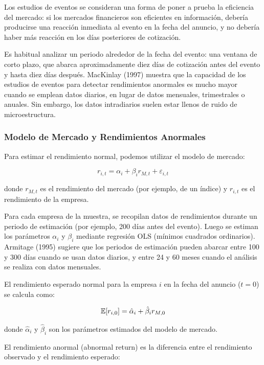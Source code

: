 Los estudios de eventos se consideran una forma de poner a prueba la eficiencia del mercado: si los mercados financieros son eficientes en información, debería producirse una reacción inmediata al evento en la fecha del anuncio, y no debería haber más reacción en los días posteriores de cotización.

Es habitual analizar un periodo alrededor de la fecha del evento: una ventana de corto plazo, que abarca aproximadamente diez días de cotización antes del evento y hasta diez días después. MacKinlay (1997) muestra que la capacidad de los estudios de eventos para detectar rendimientos anormales es mucho mayor cuando se emplean datos diarios, en lugar de datos mensuales, trimestrales o anuales. Sin embargo, los datos intradiarios suelen estar llenos de ruido de microestructura.

\subsubsection{Modelo de Mercado y Rendimientos Anormales}

Para estimar el rendimiento normal, podemos utilizar el modelo de mercado:

\begin{equation}
r_{i,t} = \alpha_i + \beta_i r_{M,t} + \varepsilon_{i,t}
\end{equation}

donde $r_{M,t}$ es el rendimiento del mercado (por ejemplo, de un índice) y $r_{i,t}$ es el rendimiento de la empresa.

Para cada empresa de la muestra, se recopilan datos de rendimientos durante un periodo de estimación (por ejemplo, 200 días antes del evento). Luego se estiman los parámetros $\alpha_i$ y $\beta_i$ mediante regresión OLS (mínimos cuadrados ordinarios). Armitage (1995) sugiere que los periodos de estimación pueden abarcar entre 100 y 300 días cuando se usan datos diarios, y entre 24 y 60 meses cuando el análisis se realiza con datos mensuales.

El rendimiento esperado normal para la empresa $i$ en la fecha del anuncio ($t = 0$) se calcula como:

\begin{equation}
\mathbb{E}[r_{i,0}] = \hat{\alpha}_i + \hat{\beta}_i r_{M,0}
\end{equation}

donde $\hat{\alpha}_i$ y $\hat{\beta}_i$ son los parámetros estimados del modelo de mercado.

El rendimiento anormal (abnormal return) es la diferencia entre el rendimiento observado y el rendimiento esperado:

